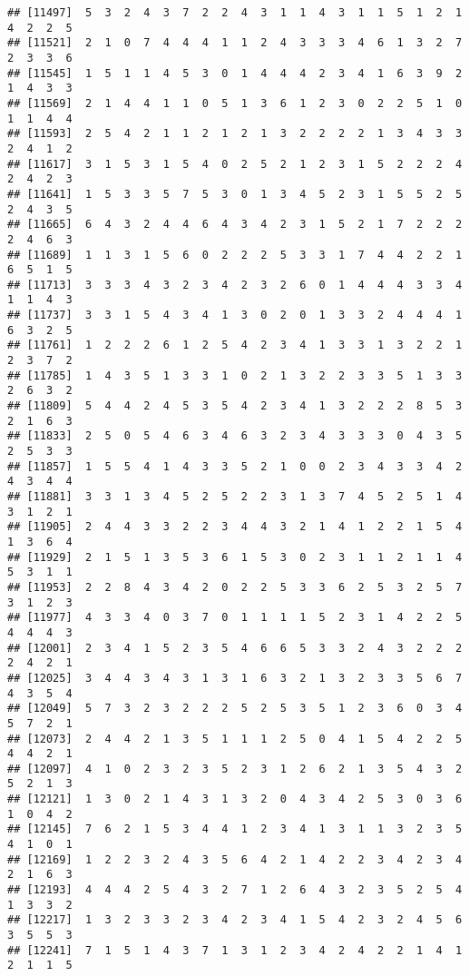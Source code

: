 \documentclass[
]{article}
\begin{document}
\begin{verbatim}
## [11497]  5  3  2  4  3  7  2  2  4  3  1  1  4  3  1  1  5  1  2  1  4  2  2  5
## [11521]  2  1  0  7  4  4  4  1  1  2  4  3  3  3  4  6  1  3  2  7  2  3  3  6
## [11545]  1  5  1  1  4  5  3  0  1  4  4  4  2  3  4  1  6  3  9  2  1  4  3  3
## [11569]  2  1  4  4  1  1  0  5  1  3  6  1  2  3  0  2  2  5  1  0  1  1  4  4
## [11593]  2  5  4  2  1  1  2  1  2  1  3  2  2  2  2  1  3  4  3  3  2  4  1  2
## [11617]  3  1  5  3  1  5  4  0  2  5  2  1  2  3  1  5  2  2  2  4  2  4  2  3
## [11641]  1  5  3  3  5  7  5  3  0  1  3  4  5  2  3  1  5  5  2  5  2  4  3  5
## [11665]  6  4  3  2  4  4  6  4  3  4  2  3  1  5  2  1  7  2  2  2  2  4  6  3
## [11689]  1  1  3  1  5  6  0  2  2  2  5  3  3  1  7  4  4  2  2  1  6  5  1  5
## [11713]  3  3  3  4  3  2  3  4  2  3  2  6  0  1  4  4  4  3  3  4  1  1  4  3
## [11737]  3  3  1  5  4  3  4  1  3  0  2  0  1  3  3  2  4  4  4  1  6  3  2  5
## [11761]  1  2  2  2  6  1  2  5  4  2  3  4  1  3  3  1  3  2  2  1  2  3  7  2
## [11785]  1  4  3  5  1  3  3  1  0  2  1  3  2  2  3  3  5  1  3  3  2  6  3  2
## [11809]  5  4  4  2  4  5  3  5  4  2  3  4  1  3  2  2  2  8  5  3  2  1  6  3
## [11833]  2  5  0  5  4  6  3  4  6  3  2  3  4  3  3  3  0  4  3  5  2  5  3  3
## [11857]  1  5  5  4  1  4  3  3  5  2  1  0  0  2  3  4  3  3  4  2  4  3  4  4
## [11881]  3  3  1  3  4  5  2  5  2  2  3  1  3  7  4  5  2  5  1  4  3  1  2  1
## [11905]  2  4  4  3  3  2  2  3  4  4  3  2  1  4  1  2  2  1  5  4  1  3  6  4
## [11929]  2  1  5  1  3  5  3  6  1  5  3  0  2  3  1  1  2  1  1  4  5  3  1  1
## [11953]  2  2  8  4  3  4  2  0  2  2  5  3  3  6  2  5  3  2  5  7  3  1  2  3
## [11977]  4  3  3  4  0  3  7  0  1  1  1  1  5  2  3  1  4  2  2  5  4  4  4  3
## [12001]  2  3  4  1  5  2  3  5  4  6  6  5  3  3  2  4  3  2  2  2  2  4  2  1
## [12025]  3  4  4  3  4  3  1  3  1  6  3  2  1  3  2  3  3  5  6  7  4  3  5  4
## [12049]  5  7  3  2  3  2  2  2  5  2  5  3  5  1  2  3  6  0  3  4  5  7  2  1
## [12073]  2  4  4  2  1  3  5  1  1  1  2  5  0  4  1  5  4  2  2  5  4  4  2  1
## [12097]  4  1  0  2  3  2  3  5  2  3  1  2  6  2  1  3  5  4  3  2  5  2  1  3
## [12121]  1  3  0  2  1  4  3  1  3  2  0  4  3  4  2  5  3  0  3  6  1  0  4  2
## [12145]  7  6  2  1  5  3  4  4  1  2  3  4  1  3  1  1  3  2  3  5  4  1  0  1
## [12169]  1  2  2  3  2  4  3  5  6  4  2  1  4  2  2  3  4  2  3  4  2  1  6  3
## [12193]  4  4  4  2  5  4  3  2  7  1  2  6  4  3  2  3  5  2  5  4  1  3  3  2
## [12217]  1  3  2  3  3  2  3  4  2  3  4  1  5  4  2  3  2  4  5  6  3  5  5  3
## [12241]  7  1  5  1  4  3  7  1  3  1  2  3  4  2  4  2  2  1  4  1  2  1  1  5

\end{verbatim}
\end{document}
